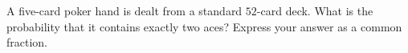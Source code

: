 A five-card poker hand is dealt from a standard $52$-card deck. What is the probability that it contains exactly two aces? Express your answer as a common fraction.

